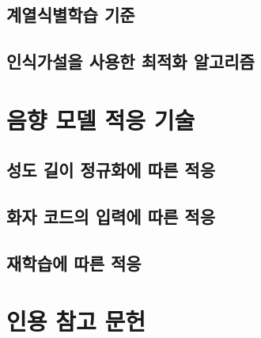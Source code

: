 \documentclass[../main.tex]{subfiles}
\begin{document}
\subsection{계열식별학습 기준}
\subsection{인식가설을 사용한 최적화 알고리즘}

\section{음향 모델 적응 기술}
\subsection{성도 길이 정규화에 따른 적응}
\subsection{화자 코드의 입력에 따른 적응}
\subsection{재학습에 따른 적응}
\section*{인용 참고 문헌}
\end{document}
